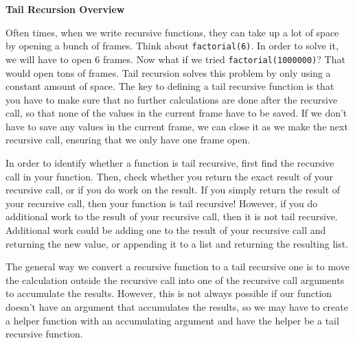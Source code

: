 \textbf{Tail Recursion Overview }


Often times, when we write recursive functions, they can take up a lot of space by opening a bunch of frames.  Think about \texttt{factorial(6)}.  In order to solve it, we will have to open 6 frames.  Now what if we tried \texttt{factorial(1000000)}?  That would open tons of frames.  Tail recursion solves this problem by only using a constant amount of space.  The key to defining a tail recursive function is that you have to make sure that no further calculations are done after the recursive call, so that none of the values in the current frame have to be saved.  If we don’t have to save any values in the current frame, we can close it as we make the next recursive call, ensuring that we only have one frame open.

In order to identify whether a function is tail recursive, first find the recursive call in your function. Then, check whether you return the exact result of your recursive call, or if you do work on the result. If you simply return the result of your recursive call, then your function is tail recursive! However, if you do additional work to the result of your recursive call, then it is not tail recursive. Additional work could be adding one to the result of your recursive call and returning the new value, or appending it to a list and returning the resulting list.

The general way we convert a recursive function to a tail recursive one is to move the calculation outside the recursive call into one of the recursive call arguments to accumulate the results. However, this is not always possible if our function doesn’t have an argument that accumulates the results, so we may have to create a helper function with an accumulating argument and have the helper be a tail recursive function.
